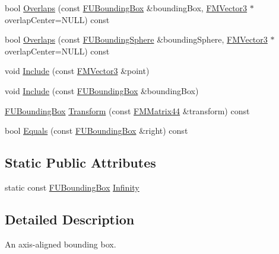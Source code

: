 \begin{DoxyCompactItemize}
\item 
bool \hyperlink{classFUBoundingBox_a29b98f6e2b73d3e0629829bccfc528b6}{Overlaps} (const \hyperlink{classFUBoundingBox}{FUBoundingBox} \&boundingBox, \hyperlink{classFMVector3}{FMVector3} $\ast$overlapCenter=NULL) const 
\item 
bool \hyperlink{classFUBoundingBox_a8e2a8ccf2a084a2909e0db4a272c6652}{Overlaps} (const \hyperlink{classFUBoundingSphere}{FUBoundingSphere} \&boundingSphere, \hyperlink{classFMVector3}{FMVector3} $\ast$overlapCenter=NULL) const 
\item 
void \hyperlink{classFUBoundingBox_a7b98eb5721ec4998c902e76327aa9ffc}{Include} (const \hyperlink{classFMVector3}{FMVector3} \&point)
\item 
void \hyperlink{classFUBoundingBox_aab46c31bca962b822b9013aa50c46418}{Include} (const \hyperlink{classFUBoundingBox}{FUBoundingBox} \&boundingBox)
\item 
\hyperlink{classFUBoundingBox}{FUBoundingBox} \hyperlink{classFUBoundingBox_ad3ec61464fae8e3f896aa0086b259990}{Transform} (const \hyperlink{classFMMatrix44}{FMMatrix44} \&transform) const 
\item 
bool \hyperlink{classFUBoundingBox_a5b310e8605cfc6f88ebfea9e2b241e8f}{Equals} (const \hyperlink{classFUBoundingBox}{FUBoundingBox} \&right) const 
\end{DoxyCompactItemize}
\subsection*{Static Public Attributes}
\begin{DoxyCompactItemize}
\item 
static const \hyperlink{classFUBoundingBox}{FUBoundingBox} \hyperlink{classFUBoundingBox_a688baae52b9ddfab1fb0082da0bffe57}{Infinity}
\end{DoxyCompactItemize}


\subsection{Detailed Description}
An axis-\/aligned bounding box. 

